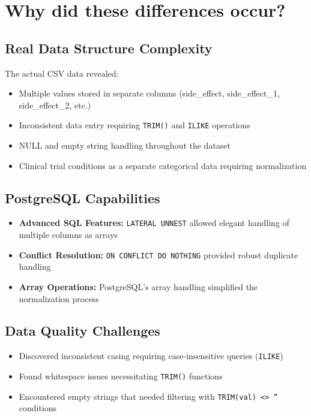 \documentclass[12pt,a4paper]{article}
\begin{document}
\section{Why did these differences occur?}

\subsection{Real Data Structure Complexity}
The actual CSV data revealed:
\begin{itemize}
    \item Multiple values stored in separate columns (side\_effect, side\_effect\_1, side\_effect\_2, etc.)
    \item Inconsistent data entry requiring \texttt{TRIM()} and \texttt{ILIKE} operations
    \item NULL and empty string handling throughout the dataset
    \item Clinical trial conditions as a separate categorical data requiring normalization
\end{itemize}

\subsection{PostgreSQL Capabilities}
\begin{itemize}
    \item \textbf{Advanced SQL Features:} \texttt{LATERAL UNNEST} allowed elegant handling of multiple columns as arrays
    \item \textbf{Conflict Resolution:} \texttt{ON CONFLICT DO NOTHING} provided robust duplicate handling
    \item \textbf{Array Operations:} PostgreSQL's array handling simplified the normalization process
\end{itemize}

\subsection{Data Quality Challenges}
\begin{itemize}
    \item Discovered inconsistent casing requiring case-insensitive queries (\texttt{ILIKE})
    \item Found whitespace issues necessitating \texttt{TRIM()} functions
    \item Encountered empty strings that needed filtering with \texttt{TRIM(val) <> ''} conditions
\end{itemize}
\end{document}
